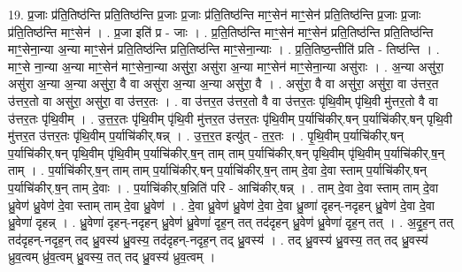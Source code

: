 \documentclass[17pt]{extarticle}
\begin{document}
19. प्र॒जाः प्र॑ति॒तिष्ठ॑न्ति प्रति॒तिष्ठ॑न्ति प्र॒जाः प्र॒जाः प्र॑ति॒तिष्ठ॑न्ति माꣳ॒॒सेन॑ माꣳ॒॒सेन॑ प्रति॒तिष्ठ॑न्ति प्र॒जाः प्र॒जाः प्र॑ति॒तिष्ठ॑न्ति माꣳ॒॒सेन॑ । . प्र॒जा इति॑ प्र - जाः । . प्र॒ति॒तिष्ठ॑न्ति माꣳ॒॒सेन॑ माꣳ॒॒सेन॑ प्रति॒तिष्ठ॑न्ति प्रति॒तिष्ठ॑न्ति माꣳ॒॒सेना॒न्या अ॒न्या माꣳ॒॒सेन॑ प्रति॒तिष्ठ॑न्ति प्रति॒तिष्ठ॑न्ति माꣳ॒॒सेना॒न्याः । . प्र॒ति॒तिष्ठ॒न्तीति॑ प्रति - तिष्ठ॑न्ति । . माꣳ॒॒से ना॒न्या अ॒न्या माꣳ॒॒सेन॑ माꣳ॒॒सेना॒न्या असु॑रा॒ असु॑रा अ॒न्या माꣳ॒॒सेन॑ माꣳ॒॒सेना॒न्या असु॑राः । . अ॒न्या असु॑रा॒ असु॑रा अ॒न्या अ॒न्या असु॑रा॒ वै वा असु॑रा अ॒न्या अ॒न्या असु॑रा॒ वै । . असु॑रा॒ वै वा असु॑रा॒ असु॑रा॒ वा उ॑त्तर॒त उ॑त्तर॒तो वा असु॑रा॒ असु॑रा॒ वा उ॑त्तर॒तः । . वा उ॑त्तर॒त उ॑त्तर॒तो वै वा उ॑त्तर॒तः पृ॑थि॒वीम् पृ॑थि॒वी मु॑त्तर॒तो वै वा उ॑त्तर॒तः पृ॑थि॒वीम् । . उ॒त्त॒र॒तः पृ॑थि॒वीम् पृ॑थि॒वी मु॑त्तर॒त उ॑त्तर॒तः पृ॑थि॒वीम् प॒र्याचि॑कीर्.षन् प॒र्याचि॑कीर्.षन् पृथि॒वी मु॑त्तर॒त उ॑त्तर॒तः पृ॑थि॒वीम् प॒र्याचि॑कीर्.षन्न् । . उ॒त्त॒र॒त इत्यु॑त् - त॒र॒तः । . पृ॒थि॒वीम् प॒र्याचि॑कीर्.षन् प॒र्याचि॑कीर्.षन् पृथि॒वीम् पृ॑थि॒वीम् प॒र्याचि॑कीर्.ष॒न् ताम् ताम् प॒र्याचि॑कीर्.षन् पृथि॒वीम् पृ॑थि॒वीम् प॒र्याचि॑कीर्.ष॒न् ताम् । . प॒र्याचि॑कीर्.ष॒न् ताम् ताम् प॒र्याचि॑कीर्.षन् प॒र्याचि॑कीर्.ष॒न् ताम् दे॒वा दे॒वा स्ताम् प॒र्याचि॑कीर्.षन् प॒र्याचि॑कीर्.ष॒न् ताम् दे॒वाः । . प॒र्याचि॑कीर्.ष॒न्निति॑ परि - आचि॑कीर्.षन्न् । . ताम् दे॒वा दे॒वा स्ताम् ताम् दे॒वा ध्रु॒वेण॑ ध्रु॒वेण॑ दे॒वा स्ताम् ताम् दे॒वा ध्रु॒वेण॑ । . दे॒वा ध्रु॒वेण॑ ध्रु॒वेण॑ दे॒वा दे॒वा ध्रु॒व्णा॑ दृहन्-नदृहन् ध्रु॒वेण॑ दे॒वा दे॒वा ध्रु॒वेणा॑ दृहन्न् । . ध्रु॒वेणा॑ दृहन्-नदृहन् ध्रु॒वेण॑ ध्रु॒वेणा॑ दृह॒न् तत् तद॑दृहन् ध्रु॒वेण॑ ध्रु॒वेणा॑ दृह॒न् तत् । . अ॒दृ॒ह॒न् तत् तद॑दृहन्-नदृह॒न् तद् ध्रु॒वस्य॑ ध्रु॒वस्य॒ तद॑दृहन्-नदृह॒न् तद् ध्रु॒वस्य॑ । . तद् ध्रु॒वस्य॑ ध्रु॒वस्य॒ तत् तद् ध्रु॒वस्य॑ ध्रुव॒त्वम् ध्रु॑व॒त्वम् ध्रु॒वस्य॒ तत् तद् ध्रु॒वस्य॑ ध्रुव॒त्वम् । \newline
\end{document}
